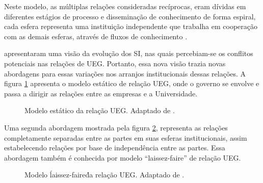 Neste modelo, as múltiplas relações consideradas recíprocas, eram dívidas em diferentes estágios de processo e disseminação de conhecimento de forma espiral, cada esfera representa uma instituição independente que trabalha em cooperação com as demais esferas, através de fluxos de conhecimento \cite{etzkowitz1998norms}.

 apresentaram uma visão da evolução dos SI, nas quais percebiam-se os conflitos potenciais nas relações de UEG. Portanto, essa nova visão trazia novas abordagens para essas variações nos arranjos institucionais dessas relações. A figura \ref{ueg_estatico} apresenta o modelo estático de relação UEG, onde o governo se envolve e passa a dirigir as relações entre as empresas e a Universidade.


\begin{figure}[ht]
  \centering
  \caption{Modelo estático da relação UEG. Adaptado de \cite{etzkowitz2003innovation}.}
  \label{ueg_estatico}
\end{figure}

Uma segunda abordagem mostrada pela figura \ref{ueg_faire}, representa as relações completamente separadas entre as partes em suas esferas institucionais, assim estabelecendo relações por base de independência entre as partes. Essa abordagem também é conhecida por modelo “laissez-faire” de relação UEG.


\begin{figure}[ht]
  \centering
  \caption{Modelo \'laissez-faire\' da relação UEG. Adaptado de \cite{etzkowitz2003innovation}.}
  \label{ueg_faire}
\end{figure}

